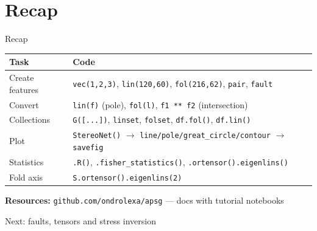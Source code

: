 \documentclass[aspectratio=169,11pt]{beamer}
\begin{document}
\section{Recap}

\begin{frame}{Recap}
  \centering
  \small
  \begin{tabular}{ll}
    \toprule
    \textbf{Task} & \textbf{Code} \\
    \midrule
    Create features & \texttt{vec(1,2,3)}, \texttt{lin(120,60)}, \texttt{fol(216,62)}, \texttt{pair}, \texttt{fault} \\
    Convert & \texttt{lin(f)} (pole), \texttt{fol(l)}, \texttt{f1 ** f2} (intersection) \\
    Collections & \texttt{G([...])}, \texttt{linset}, \texttt{folset}, \texttt{df.fol()}, \texttt{df.lin()} \\
    Plot & \texttt{StereoNet()} $\rightarrow$ \texttt{line/pole/great\_circle/contour} $\rightarrow$ \texttt{savefig} \\
    Statistics & \texttt{.R()}, \texttt{.fisher\_statistics()}, \texttt{.ortensor().eigenlins()} \\
    Fold axis & \texttt{S.ortensor().eigenlins(2)} \\
    \bottomrule
  \end{tabular}

  \vspace{0.4cm}
  \raggedright
  \textbf{Resources:} \texttt{github.com/ondrolexa/apsg} --- docs with tutorial notebooks
  \vspace{0.3cm}

  \centering \Large Next: faults, tensors and stress inversion
\end{frame}
\end{document}

